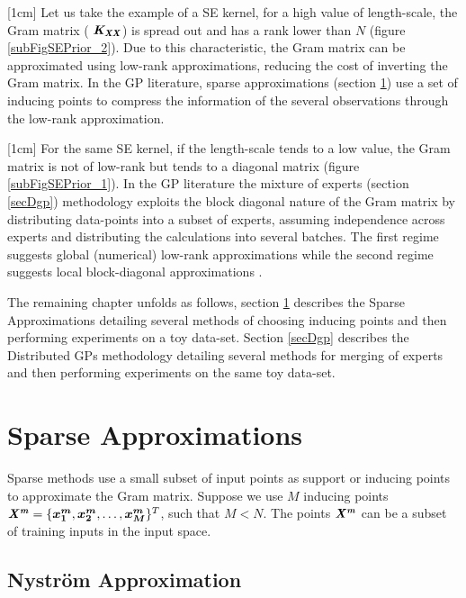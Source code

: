 [1cm]
Let us take the example of a SE kernel, for a high value of length-scale, the Gram matrix ( $\bm{\mathit{K_{XX}}}$) is spread out and has a rank lower than  $N$ (figure \ref{subFigSEPrior_2}). Due to this characteristic, the Gram matrix can be approximated using low-rank approximations, reducing the cost of inverting the Gram matrix. In the GP literature, sparse approximations (section \ref{secSparseApprox}) use a set of inducing points to compress the information of the several observations through the low-rank approximation. 

[1cm]
For the same SE kernel, if the length-scale tends to a low value, the Gram matrix is not of low-rank but tends to a diagonal matrix (figure \ref{subFigSEPrior_1}). In the GP literature the mixture of experts (section \ref{secDgp}) methodology exploits the block diagonal nature of the Gram matrix by distributing data-points into a subset of experts, assuming independence across experts and distributing the calculations into several batches. The first regime suggests global (numerical) low-rank approximations while the second regime suggests local block-diagonal approximations \cite{march2015askit, chenhan2016inv}. 

The remaining chapter unfolds as follows, section \ref{secSparseApprox} describes the Sparse Approximations detailing several methods of choosing inducing points and then performing experiments on a toy data-set. Section \ref{secDgp} describes the Distributed GPs methodology detailing several methods for merging of experts and then performing experiments on the same toy data-set. 

\section{Sparse Approximations}\label{secSparseApprox}
Sparse methods use a small subset of input points as support or inducing points to approximate the Gram matrix. Suppose we use $M$ inducing points $\bm{\mathit{X^{m}}} = \{\boldsymbol{x^{m}_{1}}, \boldsymbol{x^{m}_{2}}, \ldots, \boldsymbol{x^{m}_{M}}\}^T$, such that $M < N$. The points $\bm{\mathit{X^{m}}}$ can be a subset of training inputs in the input space. 


\subsection{Nystr\"{o}m Approximation}\label{subSecNystrom} 

